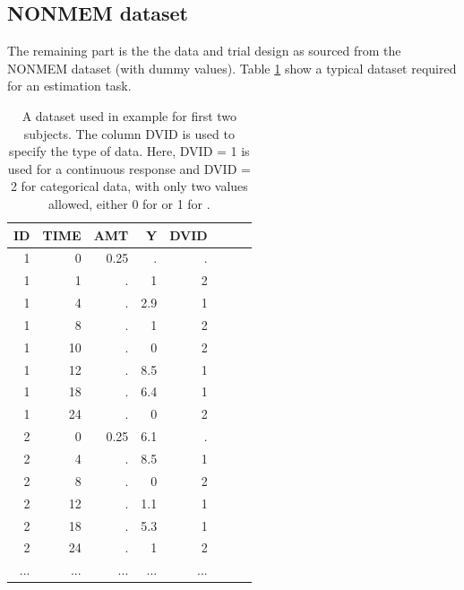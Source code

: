 \subsection{NONMEM dataset}
\label{sec:eg7-NONMEMdataset}
The remaining part is the the data and trial design as sourced from the 
NONMEM dataset (with dummy values). Table \ref{tab:example7_dataSet} show a typical dataset required for 
an estimation task.
\begin{table}[htdp]
\begin{center}
\small
\renewcommand{\arraystretch}{1.1}%
\begin{tabular}{rrrrrrrr}\toprule
ID 	& TIME	& AMT	& Y		& DVID \\ \midrule
1 	& 0 		& 0.25 	& . 		& . \\ 
1 	& 1 		& . 		& 1	 	& 2 \\ 
1 	& 4 		& . 		& 2.9 	& 1 \\ 
1 	& 8 		& . 		& 1 		& 2 \\ 
1 	& 10		& . 		& 0	 	& 2 \\ 
1 	& 12 	& . 		& 8.5 	& 1 \\ 
1 	& 18 	& . 		& 6.4 	& 1 \\ 
1 	& 24 	& . 		& 0 		& 2 \\ 
2 	& 0 		& 0.25	& 6.1 	& . \\ 
2 	& 4 		& . 		& 8.5 	& 1 \\ 
2 	& 8 		& . 		& 0 		& 2 \\ 
2 	& 12 	& . 		& 1.1 	& 1 \\ 
2 	& 18 	& . 		& 5.3 	& 1 \\ 
2 	& 24 	& . 		& 1 		& 2 \\ 
...	& ...		& ...		& ...		& ...	\\ \bottomrule
\end{tabular}
\end{center}
\caption{A dataset used in example for first two subjects.
The column DVID is used to specify the type of data. Here, 
DVID = 1 is used for a continuous response and DVID = 2 for categorical data, 
with only two values allowed, either 0 for  or 1 for .}
\label{tab:example7_dataSet}
\end{table}%

